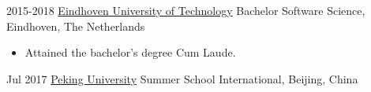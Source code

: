 { \customcventry
 {2015-2018}
 {\color{blue}\href{https://tue.nl/}{Eindhoven University of Technology}}
 {Bachelor Software Science,}
 {Eindhoven, The Netherlands}{}{}
 {
 	\begin{itemize}[leftmargin=0.6cm, label={\textbullet}]
 		\item Attained the bachelor's degree Cum Laude. 
 	\end{itemize}
 }
 
 \customcventry
 {Jul 2017}
 {\color{blue}\href{http://www.oir.pku.edu.cn/summerschool/}{Peking University}}
 {Summer School International,}
 {Beijing, China}
 {}{}
 {
 }
}

